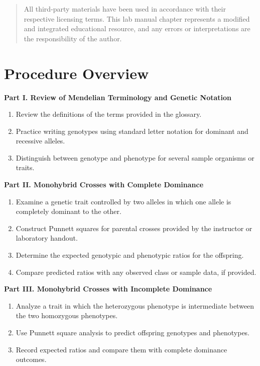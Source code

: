 \documentclass[
  letterpaper,
  DIV=11,
  numbers=noendperiod]{scrreprt}
\begin{document}
\begin{quote}
All third-party materials have been used in accordance with their
respective licensing terms. This lab manual chapter represents a
modified and integrated educational resource, and any errors or
interpretations are the responsibility of the author.
\end{quote}

\section{\texorpdfstring{\textbf{Procedure
Overview}}{Procedure Overview}}\label{procedure-overview}

\textbf{Part I. Review of Mendelian Terminology and Genetic Notation}

\begin{enumerate}
\def\labelenumi{\arabic{enumi}.}
\item
  Review the definitions of the terms provided in the glossary.
\item
  Practice writing genotypes using standard letter notation for dominant
  and recessive alleles.
\item
  Distinguish between genotype and phenotype for several sample
  organisms or traits.
\end{enumerate}

\textbf{Part II. Monohybrid Crosses with Complete Dominance}

\begin{enumerate}
\def\labelenumi{\arabic{enumi}.}
\item
  Examine a genetic trait controlled by two alleles in which one allele
  is completely dominant to the other.
\item
  Construct Punnett squares for parental crosses provided by the
  instructor or laboratory handout.
\item
  Determine the expected genotypic and phenotypic ratios for the
  offspring.
\item
  Compare predicted ratios with any observed class or sample data, if
  provided.
\end{enumerate}

\textbf{Part III. Monohybrid Crosses with Incomplete Dominance}

\begin{enumerate}
\def\labelenumi{\arabic{enumi}.}
\item
  Analyze a trait in which the heterozygous phenotype is intermediate
  between the two homozygous phenotypes.
\item
  Use Punnett square analysis to predict offspring genotypes and
  phenotypes.
\item
  Record expected ratios and compare them with complete dominance
  outcomes.
\end{enumerate}
\end{document}
